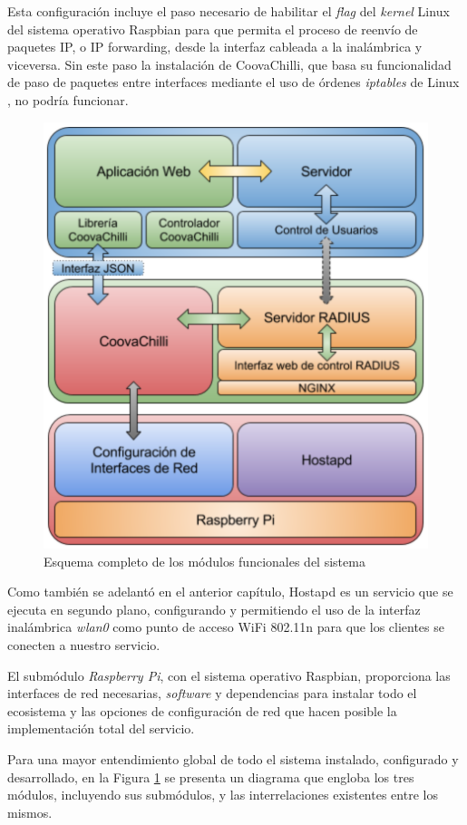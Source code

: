 Esta configuración incluye el paso necesario de habilitar el \emph{flag} del \emph{kernel} Linux del sistema operativo Raspbian para que permita el proceso de reenvío de paquetes IP, o IP forwarding, desde la interfaz cableada a la inalámbrica y viceversa. Sin este paso la instalación de CoovaChilli, que basa su funcionalidad de paso de paquetes entre interfaces mediante el uso de órdenes \emph{iptables} de Linux \cite{TUNTAP2}, no podría funcionar.

\begin{figure}[!ht]
\begin{center}
\includegraphics[width=0.75\linewidth]{./4_AnalisisFuncional/Img/modulosTotal.png}
\end{center}
\caption{Esquema completo de los módulos funcionales del sistema}
\label{modulosTotal}
\end{figure}

Como también se adelantó en el anterior capítulo, Hostapd es un servicio que se ejecuta en segundo plano, configurando y permitiendo el uso de la interfaz inalámbrica \emph{wlan0} como punto de acceso WiFi 802.11n para que los clientes se conecten a nuestro servicio.

El submódulo \emph{Raspberry Pi}, con el sistema operativo Raspbian, proporciona las interfaces de red necesarias, \emph{software} y dependencias para instalar todo el ecosistema y las opciones de configuración de red que hacen posible la implementación total del servicio.

Para una mayor entendimiento global de todo el sistema instalado, configurado y desarrollado, en la Figura \ref{modulosTotal} se presenta un diagrama que engloba los tres módulos, incluyendo sus submódulos, y las interrelaciones existentes entre los mismos.